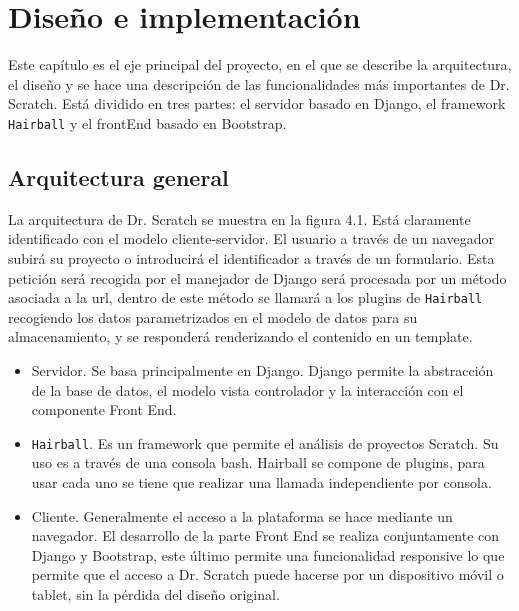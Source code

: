 \documentclass[a4paper, 12pt]{book}
\begin{document}

\cleardoublepage
\chapter{Diseño e implementación}

Este capítulo es el eje principal del proyecto, en el que se describe la arquitectura,
el diseño y se hace una descripción de las funcionalidades más importantes de Dr.
Scratch. Está dividido en tres partes: el servidor basado en Django, el framework
\texttt{Hairball} y el frontEnd basado en Bootstrap.


\section{Arquitectura general}
\label{sec:arquitectura}

La arquitectura de Dr. Scratch se muestra en la figura 4.1. Está claramente identificado
con el modelo cliente-servidor. El usuario a través de un navegador subirá su proyecto
o introducirá el identificador a través de un formulario. Esta petición será recogida 
por el manejador de Django será procesada por un método asociada a la url, dentro de 
este método se llamará a los plugins de \texttt{Hairball} recogiendo los datos parametrizados en
el modelo de datos para su almacenamiento, y se responderá renderizando el contenido
en un template.

\begin{itemize}
  \item Servidor. Se basa principalmente en Django. Django permite la abstracción de la
	base de datos, el modelo vista controlador y la interacción con el componente Front End.
  \item \texttt{Hairball}. Es un framework que permite el análisis de proyectos Scratch. Su uso es
	a través de una consola bash. Hairball se compone de plugins, para usar cada uno se
	tiene que realizar una llamada independiente por consola.
  \item Cliente. Generalmente el acceso a la plataforma se hace mediante un navegador. El
	desarrollo de la parte Front End se realiza conjuntamente con Django y Bootstrap, este
	último permite una funcionalidad responsive lo que permite que el acceso a Dr. Scratch
	puede hacerse por un dispositivo móvil o tablet, sin la pérdida del diseño original.
	
\end{itemize}
\end{document}

